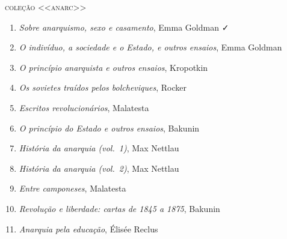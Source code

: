 \medskip
{\large\textsc{coleção <<anarc>>}}

\begin{enumerate}
\setlength\parskip{4.2pt}
\setlength\itemsep{-1.4mm}
\item \textit{Sobre anarquismo, sexo e casamento}, Emma Goldman ✓
\item \textit{O indivíduo, a sociedade e o Estado, e outros ensaios}, Emma Goldman
\item \textit{O princípio anarquista e outros ensaios}, Kropotkin
\item \textit{Os sovietes traídos pelos bolcheviques}, Rocker
\item \textit{Escritos revolucionários}, Malatesta
\item \textit{O princípio do Estado e outros ensaios}, Bakunin
\item \textit{História da anarquia (vol.~1)}, Max Nettlau
\item \textit{História da anarquia (vol.~2)}, Max Nettlau
\item \textit{Entre camponeses}, Malatesta
\item \textit{Revolução e liberdade: cartas de 1845 a 1875}, Bakunin
\item \textit{Anarquia pela educação}, Élisée Reclus 
\end{enumerate}

\pagebreak
